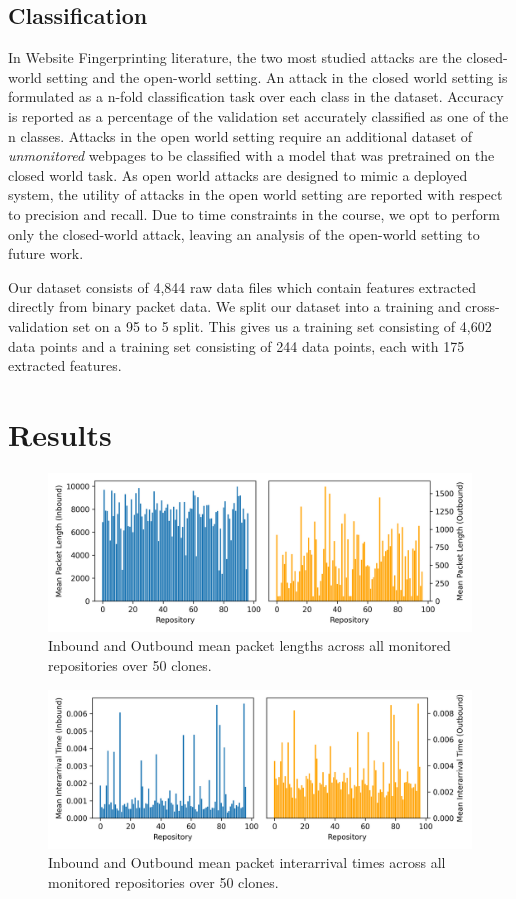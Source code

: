 \documentclass[sigconf,authorversion,nonacm]{acmart}
\begin{document}
\subsection{Classification}
In Website Fingerprinting literature, the two most studied attacks are the closed-world setting and the open-world setting. An attack in the closed world setting is formulated as a n-fold classification task over each class in the dataset. Accuracy is reported as a percentage of the validation set accurately classified as one of the n classes. Attacks in the open world setting require an additional dataset of \textit{unmonitored} webpages to be classified with a model that was pretrained on the closed world task. As open world attacks are designed to mimic a deployed system, the utility of attacks in the open world setting are reported with respect to precision and recall. Due to time constraints in the course, we opt to perform only the closed-world attack, leaving an analysis of the open-world setting to future work.

Our dataset consists of 4,844 raw data files which contain features extracted directly from binary packet data. We split our dataset into a training and cross-validation set on a 95 to 5 split. This gives us a training set consisting of 4,602 data points and a training set consisting of 244 data points, each with 175 extracted features.

\section{Results}
\begin{figure}
  \includegraphics[width=\textwidth]{charts/mean-packet-length.png}
  \caption{Inbound and Outbound mean packet lengths across all monitored repositories over 50 clones.}
  \label{fig:packetlen}
\end{figure}

\begin{figure}
  \includegraphics[width=\textwidth]{charts/interarrival-times.png}
  \caption{Inbound and Outbound mean packet interarrival times across all monitored repositories over 50 clones.}
  \label{fig:arrivaltime}
\end{figure}
\end{document}
